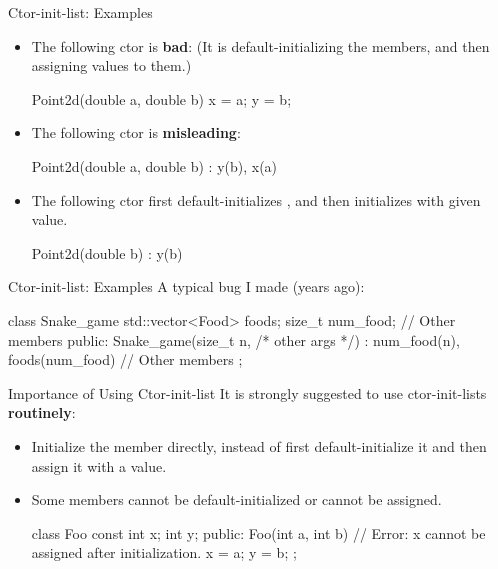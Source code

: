 \documentclass{beamer}
\begin{document}
\begin{frame}[fragile]{Ctor-init-list: Examples}
    \begin{itemize}
        \item The following ctor is \textbf{bad}: (It is default-initializing the members, and then assigning values to them.)
        \begin{cpp}
Point2d(double a, double b) {
  x = a;
  y = b;
}
        \end{cpp}
        \item The following ctor is \textbf{misleading}:
        \begin{cpp}
Point2d(double a, double b) : y(b), x(a) {}
        \end{cpp}
        \item The following ctor first default-initializes , and then initializes  with given value.
        \begin{cpp}
Point2d(double b) : y(b) {}
        \end{cpp}
    \end{itemize}
\end{frame}

\begin{frame}[fragile]{Ctor-init-list: Examples}
    A typical bug I made (years ago):
    \begin{cpp}
class Snake_game {
  std::vector<Food> foods;
  size_t num_food;
  // Other members
 public:
  Snake_game(size_t n, /* other args */)
    : num_food(n), foods(num_food) {}
  // Other members
};
    \end{cpp}
\end{frame}

\begin{frame}[fragile]{Importance of Using Ctor-init-list}
    It is strongly suggested to use ctor-init-lists \textbf{routinely}:
    \begin{itemize}
        \item Initialize the member directly, instead of first default-initialize it and then assign it with a value.
        \item Some members cannot be default-initialized or cannot be assigned.
        \begin{cpp}
class Foo {
  const int x;
  int y;
 public:
  Foo(int a, int b) {
    // Error: x cannot be assigned after initialization.
    x = a;
    y = b;
  }
};
        \end{cpp}
    \end{itemize}
\end{frame}
\end{document}
